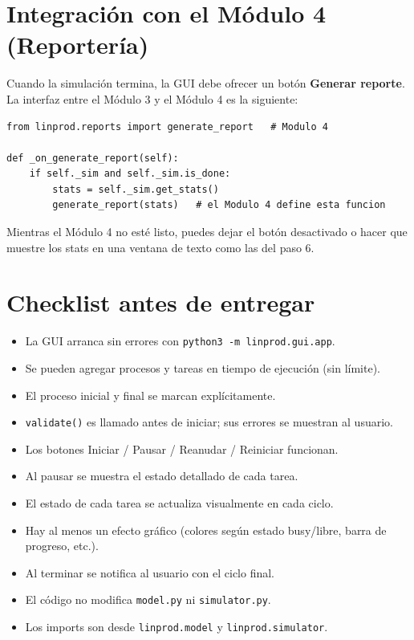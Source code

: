 \documentclass[12pt,letterpaper]{article}
\begin{document}
\section{Integración con el Módulo 4 (Reportería)}

Cuando la simulación termina, la GUI debe ofrecer un botón \textbf{Generar
reporte}. La interfaz entre el Módulo 3 y el Módulo 4 es la siguiente:

\begin{lstlisting}
from linprod.reports import generate_report   # Modulo 4

def _on_generate_report(self):
    if self._sim and self._sim.is_done:
        stats = self._sim.get_stats()
        generate_report(stats)   # el Modulo 4 define esta funcion
\end{lstlisting}

Mientras el Módulo 4 no esté listo, puedes dejar el botón desactivado o hacer
que muestre los stats en una ventana de texto como las del paso 6.

\section{Checklist antes de entregar}

\begin{itemize}[leftmargin=2em, label=\( \square \)]
    \item La GUI arranca sin errores con \texttt{python3 -m linprod.gui.app}.
    \item Se pueden agregar procesos y tareas en tiempo de ejecución (sin
          límite).
    \item El proceso inicial y final se marcan explícitamente.
    \item \texttt{validate()} es llamado antes de iniciar; sus errores se
          muestran al usuario.
    \item Los botones Iniciar / Pausar / Reanudar / Reiniciar funcionan.
    \item Al pausar se muestra el estado detallado de cada tarea.
    \item El estado de cada tarea se actualiza visualmente en cada ciclo.
    \item Hay al menos un efecto gráfico (colores según estado busy/libre,
          barra de progreso, etc.).
    \item Al terminar se notifica al usuario con el ciclo final.
    \item El código no modifica \texttt{model.py} ni \texttt{simulator.py}.
    \item Los imports son desde \texttt{linprod.model} y
          \texttt{linprod.simulator}.
\end{itemize}
\end{document}
